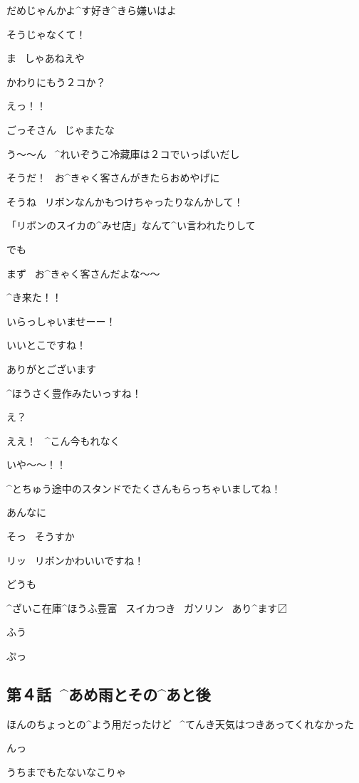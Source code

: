 \Ojisan だめじゃんかよ^{す}{好}き^{きら}{嫌}いはよ

\Alpha そうじゃなくて！

\Ojisan ま
\ しゃあねえや

\Ojisan かわりにもう２コか？

\Alpha えっ！！

\Ojisan ごっそさん
\ じゃまたな

\page[74]
\Alpha う〜〜ん
\ ^{れいぞうこ}{冷藏庫}は２コでいっぱいだし

\page[75]
\Alpha そうだ！
\ お^{きゃく}{客}さんがきたらおめやげに

\Alpha そうね
\ リボンなんかもつけちゃったりなんかして！

\Alpha 「リボンのスイカの^{みせ}{店}」なんて^{い}{言}われたりして

\Alpha でも

\Alpha まず
\ お^{きゃく}{客}さんだよな〜〜

\Alpha ^{き}{来}た！！

\page[76]
\Alpha いらっしゃいませーー！

\page[77]
\Person いいとこですね！

\Alpha ありがとございます

\Person ^{ほうさく}{豊作}みたいっすね！

\Alpha え？

\Alpha ええ！
\ ^{こん}{今}もれなく

\Person いや〜〜！！

\Person ^{とちゅう}{途中}のスタンドでたくさんもらっちゃいましてね！

\Person あんなに

\Alpha そっ
\ そうすか

\Person リッ
\ リボンかわいいですね！

\Alpha どうも

\page[78]
\Sign ^{ざいこ}{在庫}^{ほうふ}{豊富}
\ スイカつき
\ ガソリン
\ あり^{ます}{〼}

\Alpha ふう

\Alpha ぷっ


\subsection{第４話\ ^{あめ}{雨}とその^{あと}{後}}

\page[80]
\Alpha ほんのちょっとの^{よう}{用}だったけど
\ ^{てんき}{天気}はつきあってくれなかった

\Alpha んっ

\page[81]
\Alpha うちまでもたないなこりゃ


